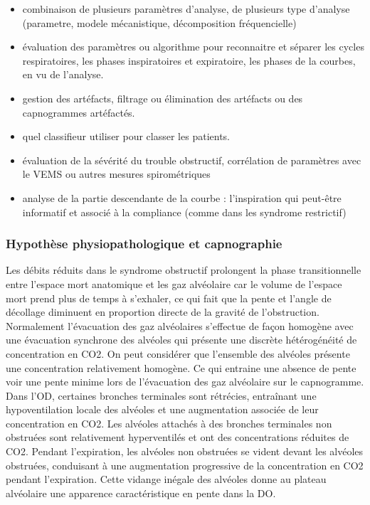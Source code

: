 \documentclass[12pt,]{article}
\begin{document}
\begin{itemize}
\item
  combinaison de plusieurs paramètres d'analyse, de plusieurs type
  d'analyse (parametre, modele mécanistique, décomposition
  fréquencielle)
\item
  évaluation des paramètres ou algorithme pour reconnaitre et séparer
  les cycles respiratoires, les phases inspiratoires et expiratoire, les
  phases de la courbes, en vu de l'analyse.
\item
  gestion des artéfacts, filtrage ou élimination des artéfacts ou des
  capnogrammes artéfactés.
\item
  quel classifieur utiliser pour classer les patients.
\item
  évaluation de la sévérité du trouble obstructif, corrélation de
  paramètres avec le VEMS ou autres mesures spirométriques
\item
  analyse de la partie descendante de la courbe : l'inspiration qui
  peut-être informatif et associé à la compliance (comme dans les
  syndrome restrictif)
\end{itemize}

\hypertarget{hypothese-physiopathologique-et-capnographie}{%
\subsubsection{Hypothèse physiopathologique et
capnographie}\label{hypothese-physiopathologique-et-capnographie}}

Les débits réduits dans le syndrome obstructif prolongent la phase
transitionnelle entre l'espace mort anatomique et les gaz alvéolaire car
le volume de l'espace mort prend plus de temps à s'exhaler, ce qui fait
que la pente et l'angle de décollage diminuent en proportion directe de
la gravité de l'obstruction. Normalement l'évacuation des gaz
alvéolaires s'effectue de façon homogène avec une évacuation synchrone
des alvéoles qui présente une discrète hétérogénéité de concentration en
CO2. On peut considérer que l'ensemble des alvéoles présente une
concentration relativement homogène. Ce qui entraine une absence de
pente voir une pente minime lors de l'évacuation des gaz alvéolaire sur
le capnogramme. Dans l'OD, certaines bronches terminales sont rétrécies,
entraînant une hypoventilation locale des alvéoles et une augmentation
associée de leur concentration en CO2. Les alvéoles attachés à des
bronches terminales non obstruées sont relativement hyperventilés et ont
des concentrations réduites de CO2. Pendant l'expiration, les alvéoles
non obstruées se vident devant les alvéoles obstruées, conduisant à une
augmentation progressive de la concentration en CO2 pendant
l'expiration. Cette vidange inégale des alvéoles donne au plateau
alvéolaire une apparence caractéristique en pente dans la DO.
\end{document}
